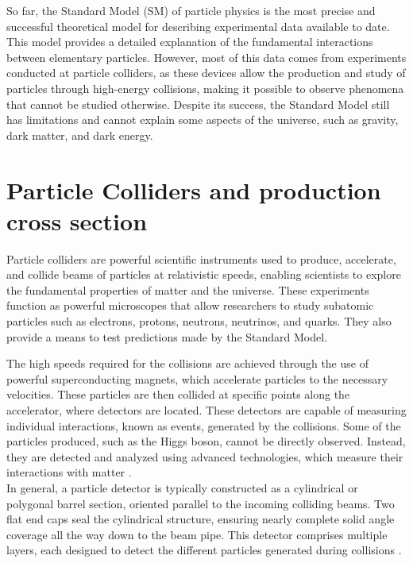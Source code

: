 So far, the Standard Model (SM) of particle physics is the most precise and successful theoretical model for describing experimental data available to date. This model provides a detailed explanation of the fundamental interactions between elementary particles. However, most of this data comes from experiments conducted at particle colliders, as these devices allow the production and study of particles through high-energy collisions, making it possible to observe phenomena that cannot be studied otherwise. Despite its success, the Standard Model still has limitations and cannot explain some aspects of the universe, such as gravity, dark matter, and dark energy.

\section{Particle Colliders and production cross section}

Particle colliders are powerful scientific instruments used to produce, accelerate, and collide beams of particles at relativistic speeds, enabling scientists to explore the fundamental properties of matter and the universe. These experiments function as powerful microscopes that allow researchers to study subatomic particles such as electrons, protons, neutrons, neutrinos, and quarks. They also provide a means to test predictions made by the Standard Model.

The high speeds required for the collisions are achieved through the use of powerful superconducting magnets, which accelerate particles to the necessary velocities. These particles are then collided at specific points along the accelerator, where detectors are located. These detectors are capable of measuring individual interactions, known as events, generated by the collisions. Some of the particles produced, such as the Higgs boson, cannot be directly observed. Instead, they are detected and analyzed using advanced technologies, which measure their interactions with matter \cite{thomson_2013}.\\

In general, a particle detector is typically constructed as a cylindrical or polygonal barrel section, oriented parallel to the incoming colliding beams. Two flat end caps seal the cylindrical structure, ensuring nearly complete solid angle coverage all the way down to the beam pipe. This detector comprises multiple layers, each designed to detect the different particles generated during collisions \cite{thomson_2013}.\\

